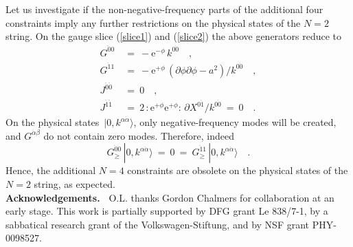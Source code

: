 \documentclass[a4paper,11pt]{article}
\def\a{\alpha}
\def\b{\beta}
\def\e{\textrm{e}}
\def\N2{$N{=}2$}
\def\NN4{$N{=}4$}
\def\pa{\mbox{$\partial$}}
\def\ad{{\dot{\alpha}}}
\def\zd{{\dot{0}}}
\def\od{{\dot{1}}}
\def\add{{\ddot{\alpha}}}
\def\zdd{{\ddot{0}}}
\def\odd{{\ddot{1}}}
\begin{document}
Let us investigate if the non-negative-frequency parts of the additional 
four constraints imply any further restrictions on the physical states 
of the \N2 string. On the gauge slice (\ref{slice1}) and (\ref{slice2})
the above generators reduce to
\begin{align}
G^{\zdd 0}\ &=\ -\e^{-\phi}\,k^{0\zd} \quad, \\
G^{\odd 1}\ &=\ -\e^{+\phi}\,(\pa\phi\pa\phi -a^2)/k^{0\zd} \quad, \\
J^{\zdd\zdd}\ &=\ 0 \quad, \\
J^{\odd\odd}\ &=\ 2\,:\e^{+\phi} \e^{+\phi}:\,\pa X^{0\od}/k^{0\zd}\ =\ 0\quad.
\end{align}
On the physical states~$|0,k^{\a\ad}\rangle$,
only negative-frequency modes will be created,
and $G^{\add\b}$ do not contain zero modes.
Therefore, indeed
\begin{equation}
G_\ge^{\zdd 0}\,|0,k^{\a\ad}\rangle\ =\ 0\ =\
G_\ge^{\odd 1}\,|0,k^{\a\ad}\rangle \quad.
\end{equation}
Hence, the additional \NN4 constraints are obsolete on the physical
states of the \N2 string, as expected.
\\


\bigskip\noindent
{\bf Acknowledgements.\  }
O.L. thanks Gordon Chalmers for collaboration at an early stage.
This work is partially supported by DFG grant Le 838/7-1, by a sabbatical
research grant of the Volkswagen-Stiftung, and by NSF grant PHY-0098527.
\end{document}
